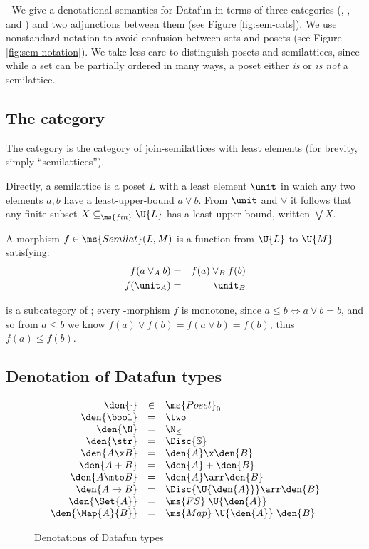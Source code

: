 \documentclass[preprint]{sigplanconf}
\newcommand{\uto}{\to}
\renewcommand{\FS}[1]{\ms{FS}\;{#1}}
\newcommand{\FM}[2]{\ms{Map}\;{#1}\;{#2}}
\begin{document}

We give a denotational semantics for Datafun in terms of three categories
(, , and ) and two adjunctions between them (see
Figure \ref{fig:sem-cats}). We use nonstandard notation to avoid confusion
between sets and posets (see Figure \ref{fig:sem-notation}). We take less care
to distinguish posets and semilattices, since while a set can be partially
ordered in many ways, a poset either \emph{is} or \emph{is not} a semilattice.

\subsection{The category }

The category  is the category of join-semilattices with least
elements (for brevity, simply ``semilattices'').

Directly, a semilattice is a poset $L$ with a least element $\unit$ in which any
two elements $a,b$ have a least-upper-bound $a \vee b$. From $\unit$ and $\vee$
it follows that any finite subset $X \subseteq_{\ms{fin}} \U{L}$ has a least
upper bound, written $\bigvee X$.

A morphism $f \in \ms{Semilat}(L, M)$ is a function from $\U{L}$ to $\U{M}$
satisfying:
\begin{eqnarray*}
  f(a \vee_A b) &=& f(a) \vee_B f(b)\\
  f(\unit_A) &=& \unit_B
\end{eqnarray*}

 is a subcategory of ; every -morphism $f$ is
monotone, since $a \le b \iff a \vee b = b$, and so from $a \le b$ we know $f(a)
\vee f(b) = f(a \vee b) = f(b)$, thus $f(a) \le f(b)$.

\subsection{Denotation of Datafun types}
\begin{figure}
  \[\begin{array}{rcl}
  \den{\cdot} &\in& \ms{Poset}_0\\
  \den{\bool} &=& \two\\
  \den{\N} &=& \N_\le\\
  \den{\str} &=& \Disc{\mathbb{S}}\\
  \den{A \x B} &=& \den{A} \x \den{B}\\
  \den{A + B} &=& \den{A} + \den{B}\\
  \den{A \mto B} &=& \den{A} \arr \den{B}\\
  \den{A \uto B} &=& \Disc{\U{\den{A}}} \arr \den{B}\\
  \den{\Set{A}} &=& \FS{\U{\den{A}}}\\
  \den{\Map{A}{B}} &=& \FM{\U{\den{A}}}{\den{B}}
  \end{array}\]
  \caption{Denotations of Datafun types}
  \label{fig:sem-types}
\end{figure}
\end{document}
